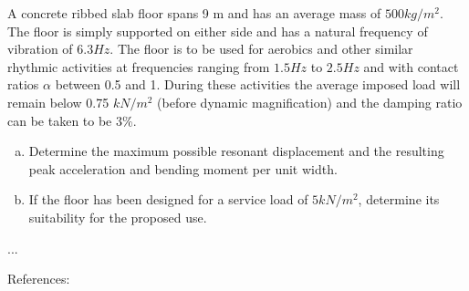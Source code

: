 
\begin{Exercise}[label={footfall_analysis}]
A concrete ribbed slab floor spans 9 m and has an average mass of $500 kg/m^2$. The floor is simply supported on either side and has a natural frequency of vibration of $6.3 Hz$. The floor is to be used for aerobics and other similar rhythmic activities at frequencies ranging from $1.5 Hz$ to $2.5 Hz$ and with contact ratios $\alpha$ between 0.5 and 1. During these activities the average imposed load will remain below 0.75 $kN/m^2$ (before dynamic magnification) and the damping ratio can be taken to be $3\%$.

\begin{enumerate}[(a)]
    \item Determine the maximum possible resonant displacement and the resulting peak acceleration and bending moment per unit width.
    \item If the floor has been designed for a service load of $5kN/m^2$, determine its suitability for the proposed use.
\end{enumerate}

\begin{center}
\hspace{1em}
\end{center}

\shortAnswer ...

References: \cite[page ??]{chopra}
\end{Exercise}



